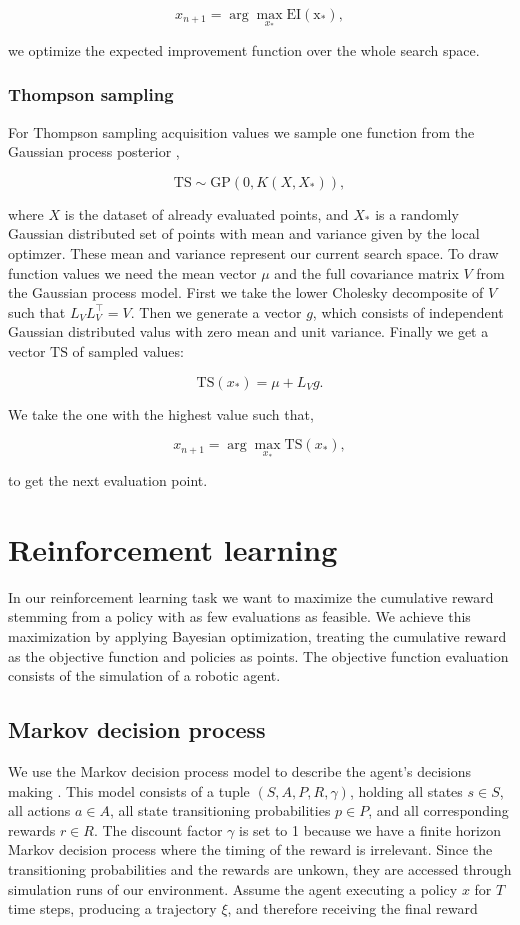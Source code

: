 $$x_{n+1} = \arg \max_{x_*} \mathrm{EI(x_*)},$$

we optimize the expected improvement function over the whole search space.

\subsubsection{Thompson sampling}
For Thompson sampling acquisition values we sample one function from the Gaussian process posterior \cite{shahriari2016taking},

$$\mathrm{TS}\sim \mathrm{GP}(0,K(X,X_*)),$$

where $X$ is the dataset of already evaluated points, and $X_*$ is a randomly Gaussian distributed set of points with mean and variance given by the local optimzer. These mean and variance represent our current search space.
To draw function values we need the mean vector $\mu$ and the full covariance matrix $V$ from the Gaussian process model. First we take the lower Cholesky decomposite of $V$ such that $L_V L_V^\top = V$. Then we generate a vector $g$, which consists of independent Gaussian distributed valus with zero mean and unit variance. Finally we get a vector $\mathrm{TS}$ of sampled values:

$$\mathrm{TS}(x_*) = \mu + L_V g.$$

We take the one with the highest value such that,

$$x_{n+1} = \arg \max_{x_*} \mathrm{TS}(x_*),$$

to get the next evaluation point.

\section{Reinforcement learning}

In our reinforcement learning task we want to maximize the cumulative reward stemming from a policy with as few evaluations as feasible. We achieve this maximization by applying Bayesian optimization, treating the cumulative reward as the objective function and policies as points. The objective function evaluation consists of the simulation of a robotic agent.

\subsection{Markov decision process}
We use the Markov decision process model to describe the agent's decisions making \cite{sutton1998reinforcement}. This model consists of a tuple $(S,A,P,R,\gamma)$, holding all states $s \in S$, all actions $a \in A$, all state transitioning probabilities $p \in P$, and all corresponding rewards $r \in R$. The discount factor $\gamma$ is set to 1 because we have a finite horizon Markov decision process where the timing of the reward is irrelevant. Since the transitioning probabilities and the rewards are unkown, they are accessed through simulation runs of our environment. Assume the agent executing a policy $x$ for $T$ time steps, producing a trajectory $\xi$, and therefore receiving the final reward

